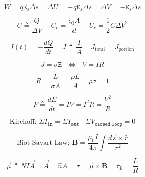 \documentclass[twocolumn, 12pt]{article}
\begin{document}
\begin{equation*}
    W = q\texttt{E}_s\Delta s \hspace{15pt}  \Delta U =-q\texttt{E}_s\Delta s \hspace{15pt} \Delta V = - \texttt{E}_s \Delta s
\end{equation*}

\begin{equation*}
    C \triangleq \frac{Q}{\Delta V } \hspace{15pt} C_c = \frac{\epsilon_0 A}{d}  \hspace{15pt}  U_c= \frac{1}{2} C \Delta V^2
\end{equation*}

\begin{equation*}
    I(t) = - \frac{dQ}{dt} \hspace{15pt} J \triangleq \frac{I}{A}  \hspace{15pt} J_{\text{total}} = J_{\text{portion}}
\end{equation*}

\begin{equation*}
    \boxed{ J=\sigma \texttt{E} \hspace{8pt} \Longleftrightarrow \hspace{8pt}  V=IR}
\end{equation*}

\begin{equation*}
    R = \frac{L}{\sigma A} = \frac{\rho L}{A} \hspace{15pt} \rho \sigma =1
\end{equation*}

\begin{equation*}
    P \triangleq \frac{dE}{dt} = IV = I^2R = \frac{V^2}{R}
\end{equation*}

\begin{equation*}
    \text{Kirchoff: }\boxed{  \Sigma I_{\texttt{in}} = \Sigma I_{\texttt{out}}  \hspace{10pt}  \Sigma V_{\texttt{closed loop}} =0}
\end{equation*}

\begin{equation*}
    \text{Biot-Savart Law:  } \boxed{\textbf{B} = \frac{\mu_0 I}{4\pi} \int \frac{d\vec{s} \times \hat{r}}{r^2} }
\end{equation*}

\begin{equation*}
    \vec{\mu} \triangleq N I \vec{A} \hspace{15pt} \vec{A} = \hat{n}A \hspace{15pt} \tau = \vec{\mu} \times \textbf{B} \hspace{15pt} \tau_L =\frac{L}{R}  
\end{equation*}
\end{document}
